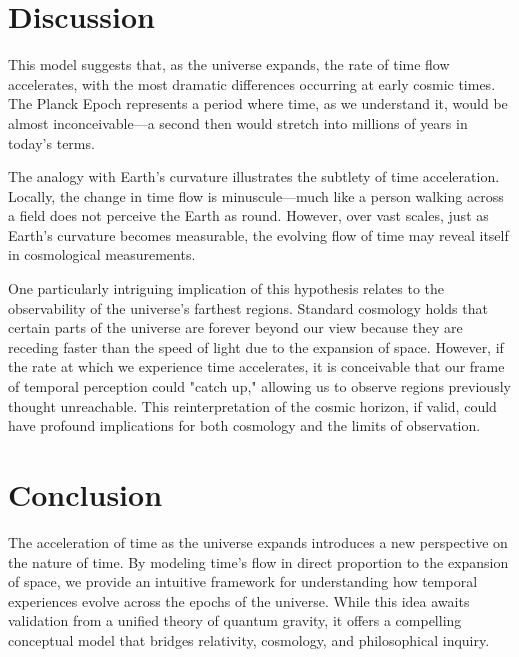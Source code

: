 \documentclass[12pt]{article}
\begin{document}
\section{Discussion}
This model suggests that, as the universe expands, the rate of time flow accelerates, with the most dramatic differences occurring at early cosmic times. The Planck Epoch represents a period where time, as we understand it, would be almost inconceivable—a second then would stretch into millions of years in today’s terms.

The analogy with Earth's curvature illustrates the subtlety of time acceleration. Locally, the change in time flow is minuscule—much like a person walking across a field does not perceive the Earth as round. However, over vast scales, just as Earth's curvature becomes measurable, the evolving flow of time may reveal itself in cosmological measurements.

One particularly intriguing implication of this hypothesis relates to the observability of the universe’s farthest regions. Standard cosmology holds that certain parts of the universe are forever beyond our view because they are receding faster than the speed of light due to the expansion of space. However, if the rate at which we experience time accelerates, it is conceivable that our frame of temporal perception could "catch up," allowing us to observe regions previously thought unreachable. This reinterpretation of the cosmic horizon, if valid, could have profound implications for both cosmology and the limits of observation.

\section{Conclusion}
The acceleration of time as the universe expands introduces a new perspective on the nature of time. By modeling time's flow in direct proportion to the expansion of space, we provide an intuitive framework for understanding how temporal experiences evolve across the epochs of the universe. While this idea awaits validation from a unified theory of quantum gravity, it offers a compelling conceptual model that bridges relativity, cosmology, and philosophical inquiry.
\end{document}

